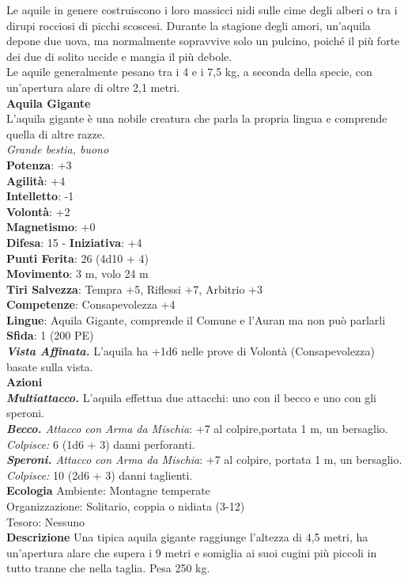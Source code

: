 \begin{multicols}{2}
Le aquile in genere costruiscono i loro massicci nidi sulle cime degli alberi o tra i dirupi rocciosi di picchi scoscesi. Durante la stagione degli amori, un’aquila depone due uova, ma normalmente sopravvive solo un pulcino, poiché il più forte dei due di solito uccide e mangia il più debole.\\

Le aquile generalmente pesano tra i 4 e i 7,5 kg, a seconda della specie, con un’apertura alare di oltre 2,1 metri.\\

\medskip\textbf{Aquila Gigante}\\
L'aquila gigante è una nobile creatura che parla la propria lingua e comprende quella di altre razze.\\
\emph{Grande bestia, buono}\\
\textbf{Potenza}: +3\\
\textbf{Agilità}: +4\\
\textbf{Intelletto}: -1\\
\textbf{Volontà}: +2\\
\textbf{Magnetismo}: +0\\
\textbf{Difesa}: 15 - \textbf{Iniziativa}: +4\\
\textbf{Punti Ferita}: 26 (4d10 + 4)\\
\textbf{Movimento}: 3 m, volo 24 m\\
\textbf{Tiri Salvezza}: Tempra +5, Riflessi +7, Arbitrio +3\\
\textbf{Competenze}: Consapevolezza +4\\
\textbf{Lingue}: Aquila Gigante, comprende il Comune e l'Auran ma non può parlarli\\
\textbf{Sfida}: 1 (200 PE)\smallskip\\
\emph{\textbf{Vista Affinata.}} L'aquila ha +1d6 nelle prove di Volontà (Consapevolezza) basate sulla vista.\\
\smallskip\textbf{Azioni}\\
\emph{\textbf{Multiattacco.}} L'aquila effettua due attacchi: uno con il becco e uno con gli speroni.\\
\emph{\textbf{Becco.} Attacco con Arma da Mischia}: +7 al colpire,portata 1 m, un bersaglio.\\
\emph{Colpisce:} 6 (1d6 + 3) danni perforanti.\\
\emph{\textbf{Speroni.} Attacco con Arma da Mischia}: +7 al colpire, portata 1 m, un bersaglio.\\
\emph{Colpisce:} 10 (2d6 + 3) danni taglienti.\\
\textbf{Ecologia}
Ambiente: Montagne temperate\\
Organizzazione: Solitario, coppia o nidiata (3-12)\\
Tesoro: Nessuno\\
\textbf{Descrizione}
Una tipica aquila gigante raggiunge l’altezza di 4,5 metri, ha un’apertura alare che supera i 9 metri e somiglia ai suoi cugini più piccoli in tutto tranne che nella taglia. Pesa 250 kg.\\


\end{multicols}
